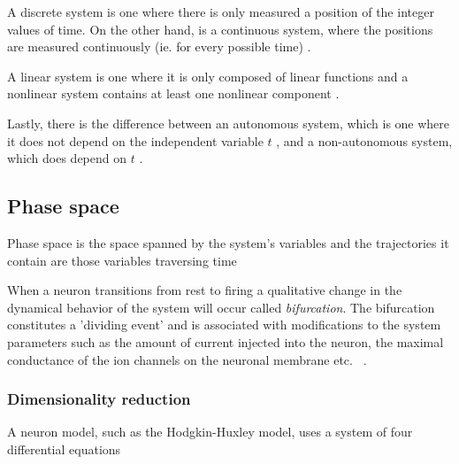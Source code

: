 \documentclass[../../Orator.tex]{subfiles}
\begin{document}
A discrete system is one where there is only measured a position of the integer values of time. On the other hand, is a continuous system, where the positions are measured continuously (ie. for every possible time) \cite{}.

A linear system is one where it is only composed of linear functions and a nonlinear system contains at least one nonlinear component \cite{}.

Lastly, there is the difference between an autonomous system, which is one where it does not depend on the independent variable \(t\) \cite{}, and a non-autonomous system, which does depend on \(t\) \cite{}.


\begin{comment}
    \begin{split}\left[\begin{array}{ccll}
    {\displaystyle \frac{du}{dt}} &=& u\left(1-u^{2}\right)-w+I \equiv F(u,w)\\[.2cm]
    {\displaystyle \frac{dw}{dt}} &=& \varepsilon \left(u -0.5w+1\right) \equiv \varepsilon G(u,w)\, ,\\
    \end{array}\right.\end{split}
    [ref:https://neuronaldynamics-exercises.readthedocs.io/en/latest/exercises/brunel-network.html]
\end{comment}

\subsection{Phase space}
Phase space is the space spanned by the system's variables and the trajectories it contain are those variables traversing time

When a neuron transitions from rest to firing a qualitative change in the dynamical behavior of the system will occur called \textit{bifurcation}. The bifurcation constitutes a 'dividing event' and is associated with modifications to the system parameters such as the amount of current injected into the neuron, the maximal conductance of the ion
channels on the neuronal membrane etc. ~\cite{STEFANESCU2012748}.





\subsubsection{Dimensionality reduction}
A neuron model, such as the Hodgkin-Huxley model, uses a system of four differential equations
\end{document}
